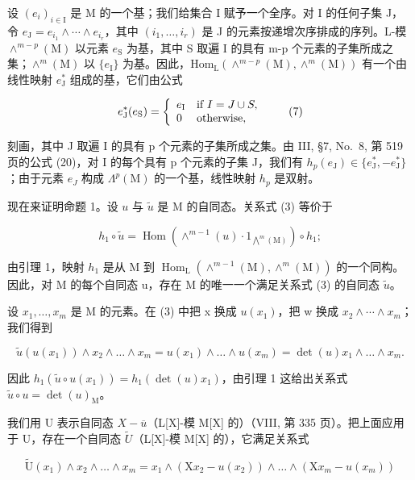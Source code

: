 设 \((e_{i})_{i\in\mathrm{I}}\) 是 M 的一个基；我们给集合 I 赋予一个全序。对 I 的任何子集 J，令 \(e_{\mathrm{J}}=e_{i_{1}}\wedge\cdots\wedge e_{i_{r}}\)，其中 \((i_{1},\ldots,i_{r})\) 是 J 的元素按递增次序排成的序列。L-模 \(\wedge^{m-p}(\mathrm{M})\) 以元素 \(e_{\mathrm{S}}\) 为基，其中 S 取遍 I 的具有 m-p 个元素的子集所成之集；\(\wedge^{m}(\mathrm{M})\) 以 \(\{e_{\mathrm{I}}\}\) 为基。因此，\(\mathrm{Hom}_{\mathrm{L}}(\wedge^{m-p}(\mathrm{M}),\wedge^{m}(\mathrm{M}))\) 有一个由线性映射 \(e_{\mathrm{J}}^{*}\) 组成的基，它们由公式

\[
e _ {\mathrm{J}} ^ {*} (e _ {\mathrm{S}}) = \left\{ \begin{array}{l l} e _ {\mathrm{I}} & \text {if } I = J\cup S, \\ 0 & \text {otherwise}, \end{array} \right.\tag{7}
\]

刻画，其中 J 取遍 I 的具有 p 个元素的子集所成之集。由 III, §7, No.~8, 第 519 页的公式 (20)，对 I 的每个具有 p 个元素的子集 J，我们有 \(h_{p}(e_{\mathrm{J}}) \in \{e_{\mathrm{J}}^{*}, -e_{\mathrm{J}}^{*}\}\)；由于元素 \(e_{J}\) 构成 \(\Lambda^{p}(\mathrm{M})\) 的一个基，线性映射 \(h_{p}\) 是双射。

现在来证明命题 1。设 \(u\) 与 \(\widetilde{u}\) 是 M 的自同态。关系式 (3) 等价于

\[
h _ {1} \circ \widetilde {u} = \operatorname{Hom} (\wedge^ {m - 1} (u) \cdot 1 _ {\bigwedge^ {m} (\mathrm{M})}) \circ h _ {1};\tag{8}
\]

由引理 1，映射 \(h_{1}\) 是从 M 到 \(\operatorname{Hom}_{\mathrm{L}}(\wedge^{m-1}(\mathrm{M}),\wedge^{m}(\mathrm{M}))\) 的一个同构。因此，对 M 的每个自同态 u，存在 M 的唯一一个满足关系式 (3) 的自同态 \(\widetilde{u}\)。

设 \(x_{1},\ldots,x_{m}\) 是 M 的元素。在 (3) 中把 x 换成 \(u(x_{1})\)，把 w 换成 \(x_{2}\wedge\cdots\wedge x_{m}\)；我们得到

\[
\widetilde {u} (u (x _ {1})) \wedge x _ {2} \wedge \dots \wedge x _ {m} = u (x _ {1}) \wedge \dots \wedge u (x _ {m}) = \det (u) x _ {1} \wedge \dots \wedge x _ {m}.
\]

因此 \(h_1(\widetilde{u} \circ u(x_1)) = h_1(\det(u)x_1)\)，由引理 1 这给出关系式 \(\widetilde{u} \circ u = \det(u)_\mathrm{M}\)。

我们用 U 表示自同态 \(X - \overline{u}\)（L{[}X{]}-模 M{[}X{]} 的）（VIII, 第 335 页）。把上面应用于 U，存在一个自同态 \(\widetilde{U}\)（L{[}X{]}-模 M{[}X{]} 的），它满足关系式

\[
\widetilde {\mathrm{U}} (x _ {1}) \wedge x _ {2} \wedge \dots \wedge x _ {m} = x _ {1} \wedge (\mathrm{X} x _ {2} - u (x _ {2})) \wedge \dots \wedge (\mathrm{X} x _ {m} - u (x _ {m}))\tag{9}
\]

